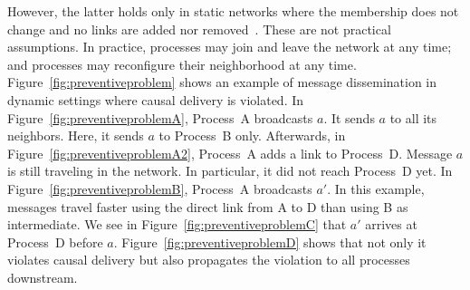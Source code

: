 \begin{figure*}
  \begin{center}
    \hspace{20pt}
    \hspace{20pt}
    \hspace{20pt}
    \hspace{20pt}
    \caption{\label{fig:preventiveproblem}Preventive causal broadcast may
      violate causal order in dynamic settings.}
  \end{center}
\end{figure*}


However, the latter holds only in static networks where the membership does not
change and no links are added nor removed~\cite{friedman2004causal}. These are
not practical assumptions.  In practice, processes may join and leave the
network at any time; and processes may reconfigure their neighborhood at any
time.  Figure~\ref{fig:preventiveproblem} shows an example of message
dissemination in dynamic settings where causal delivery is violated. In
Figure~\ref{fig:preventiveproblemA}, Process~A broadcasts $a$. It sends $a$ to
all its neighbors. Here, it sends $a$ to Process~B only.  Afterwards, in
Figure~\ref{fig:preventiveproblemA2}, Process~A adds a link to
Process~D. Message $a$ is still traveling in the network. In particular, it did
not reach Process~D yet. In Figure~\ref{fig:preventiveproblemB}, Process~A
broadcasts $a'$. In this example, messages travel faster using the direct link
from A to D than using B as intermediate.  We see in
Figure~\ref{fig:preventiveproblemC} that $a'$ arrives at Process~D before
$a$. Figure~\ref{fig:preventiveproblemD} shows that not only it violates causal
delivery but also propagates the violation to all processes downstream.


